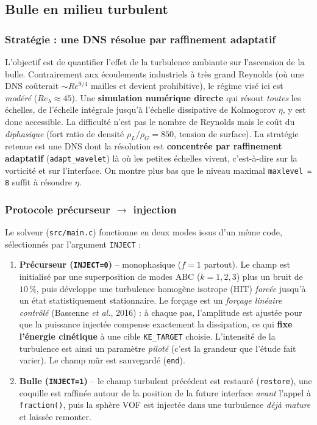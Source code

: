 \subsection{Bulle en milieu turbulent}

\subsubsection{Stratégie : une DNS résolue par raffinement adaptatif}

L'objectif est de quantifier l'effet de la turbulence ambiante sur l'ascension de la bulle.
Contrairement aux écoulements industriels à très grand Reynolds (où une DNS coûterait
$\sim Re^{9/4}$ mailles et devient prohibitive), le régime visé ici est \emph{modéré}
($Re_\lambda \approx 45$). Une \textbf{simulation numérique directe} qui résout \emph{toutes}
les échelles, de l'échelle intégrale jusqu'à l'échelle dissipative de Kolmogorov $\eta$,
y est donc accessible. La difficulté n'est pas le nombre de Reynolds mais le coût du
\emph{diphasique} (fort ratio de densité $\rho_L/\rho_G = 850$, tension de surface). La
stratégie retenue est une DNS dont la résolution est \textbf{concentrée par raffinement
adaptatif} (\texttt{adapt\_wavelet}) là où les petites échelles vivent, c'est-à-dire sur
la vorticité et sur l'interface. On montre plus bas que le niveau maximal
\texttt{maxlevel = 8} suffit à résoudre $\eta$.

\subsubsection{Protocole précurseur $\rightarrow$ injection}

Le solveur (\texttt{src/main.c}) fonctionne en deux modes issus d'un même code, sélectionnés
par l'argument \texttt{INJECT} :

\begin{enumerate}
    \item \textbf{Précurseur (\texttt{INJECT=0})} -- monophasique ($f=1$ partout). Le champ
    est initialisé par une superposition de modes ABC ($k=1,2,3$) plus un bruit de $10\,\%$,
    puis développe une turbulence homogène isotrope (HIT) \emph{forcée} jusqu'à un état
    statistiquement stationnaire. Le forçage est un \emph{forçage linéaire contrôlé}
    (Bassenne \textit{et al.}, 2016) : à chaque pas, l'amplitude est ajustée pour que la
    puissance injectée compense exactement la dissipation, ce qui \textbf{fixe l'énergie
    cinétique} à une cible \texttt{KE\_TARGET} choisie. L'intensité de la turbulence est
    ainsi un paramètre \emph{piloté} (c'est la grandeur que l'étude fait varier). Le champ
    mûr est sauvegardé (\texttt{end}).
    \item \textbf{Bulle (\texttt{INJECT=1})} -- le champ turbulent précédent est restauré
    (\texttt{restore}), une coquille est raffinée autour de la position de la future interface
    \emph{avant} l'appel à \texttt{fraction()}, puis la sphère VOF est injectée dans une
    turbulence \emph{déjà mature} et laissée remonter.
\end{enumerate}

